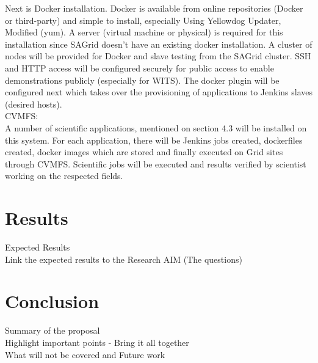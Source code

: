 \documentclass [titlepage,11pt]{article}
\begin{document}
Next is Docker installation. Docker is available from online repositories (Docker or third-party) and simple to install, especially Using Yellowdog Updater, Modified (yum).  A server (virtual machine or physical) is required for this installation since SAGrid doesn't have an existing docker installation. A cluster of nodes will be provided for Docker and slave testing from the SAGrid cluster. SSH and HTTP access will be configured securely for public access to enable demonstrations publicly (especially for WITS). The docker plugin will be configured next which takes over the provisioning of applications to Jenkins slaves (desired hosts).  \\

CVMFS: \\

A number of scientific applications, mentioned on section 4.3 will be installed on this system. For each application, there will be Jenkins jobs created, dockerfiles created, docker images which are stored and finally executed on Grid sites through CVMFS. Scientific jobs will be executed and results verified by scientist working on the respected fields. 



\section{Results}
Expected Results \\
Link the expected results to the Research AIM (The questions)

\section{Conclusion}
Summary of the proposal \\
Highlight important points  - Bring it all together\\
What will not be covered and Future work \\


\end{document}
